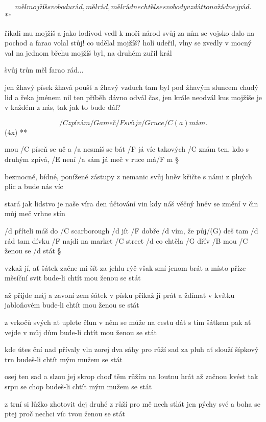 \R \[ měl mojžíš svobodu rád, měl rád, měl rád
   nechtěl se svobody vzdát to na žádnej pád.\]**

říkali mu mojžíš a jako lodivod vedl k moři národ svůj
za ním se vojsko dalo na pochod a farao volal stůj! \s
co udělal mojžíš? holí udeřil, vlny se zvedly v mocný val
na jednom břehu mojžíš byl, na druhém zuřil král \s

\r svůj trůn měl farao rád...

jen žhavý písek žhavá poušť a žhavý vzduch tam byl
pod žhavým sluncem chudý lid a řeka jménem nil \s
ten příběh dávno odvál čas, jen krále neodvál
kus mojžíše je v každém z nás, tak jak to bude dál?




\R \[ /C zpívám /G a meč /F svůj v /G ruce /{C (a)} mám. \](4x) **

mou /C píseň se uč a /a nesmíš se bát
/F já víc takových /C znám
ten, kdo s druhým zpívá, /E není /a sám
já meč v ruce má/F m \S

bezmocné, bídné, ponížené
zástupy z nemanic
svůj hněv křičte s námi z plných plic
a bude nás víc \s

stará jak lidstvo je naše víra
den účtování vin
kdy náš věčný hněv se změní v čin
můj meč vrhne stín \s




/d příteli máš do /C scarborough /d jít
/F dobře /d vím, že půj/(G) deš tam /d rád
tam dívku /F najdi na market /C street
/d co chtěla /G dřív /B mou /C ženou se /d stát \S

vzkaž jí, ať šátek začne mi šít
za jehlu rýč však smí jenom brát
a místo příze měsíční svit
bude-li chtít mou ženou se stát \s

až přijde máj a zavoní zem
šátek v písku přikaž jí prát
a ždímat v kvítku jabloňovém
bude-li chtít mou ženou se stát \s

z vrkočů svých ať uplete člun
v něm se může na cestu dát
s tím šátkem pak ať vejde v můj dům
bude-li chtít mou ženou se stát \s

kde útes ční nad přívaly vln
zorej dva sáhy pro růží sad
za pluh ať slouží šípkový trn
budeš-li chtít mým mužem se stát \s

osej ten sad a slzou jej skrop
choď těm růžím na loutnu hrát
až začnou kvést tak srpu se chop
budeš-li chtít mým mužem se stát \s

z trní si lůžko zhotovit dej
druhé z růží pro mě nech stlát
jen pýchy své a boha se ptej
proč nechci víc tvou ženou se stát



